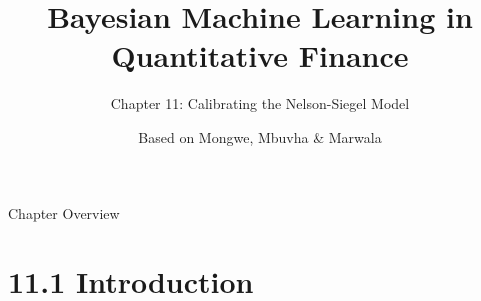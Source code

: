 \documentclass[aspectratio=169,10pt]{beamer}
\title[Bayesian ML in QF -- Ch.11]{Bayesian Machine Learning in Quantitative Finance}
\subtitle{Chapter 11: Calibrating the Nelson-Siegel Model}
\author{Based on Mongwe, Mbuvha \& Marwala}
\institute{Springer, 2025}
\date{}
\begin{document}
\begin{frame}
  \titlepage
\end{frame}

\begin{frame}{Chapter Overview}
  \tableofcontents
\end{frame}


\section{11.1 Introduction}
\end{document}
